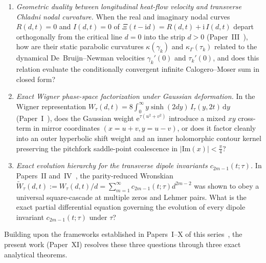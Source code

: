 \documentclass[11pt,reqno]{amsart}
\theoremstyle{definition}
\theoremstyle{remark}
\numberwithin{equation}{section}
\newcommand{\dd}{\mathrm{d}}
\newcommand{\ee}{\mathrm{e}}
\newcommand{\ii}{\mathrm{i}}
\newcommand{\Ima}{\mathrm{Im}}
\begin{document}
\begin{enumerate}[label=\textup{(\arabic*)},leftmargin=2.2em]
\item \textit{Geometric duality between longitudinal heat-flow velocity and transverse Chladni nodal curvature.} When the real and imaginary nodal curves $R(d,t) = 0$ and $I(d,t) = 0$ of $\Xi(t - \ii d) = R(d,t) + \ii\,I(d,t)$ depart orthogonally from the critical line $d = 0$ into the strip $d > 0$ (Paper~III~\cite{missiaen2026paper3}), how are their static parabolic curvatures $\kappa(\gamma_k)$ and $\kappa_\Gamma(\tau_k)$ related to the dynamical De~Bruijn--Newman velocities $\gamma_k'(0)$ and $\tau_k'(0)$, and does this relation evaluate the conditionally convergent infinite Calogero--Moser sum in closed form?
\item \textit{Exact Wigner phase-space factorization under Gaussian deformation.} In the Wigner representation $W_\tau(d,t) = 8\int_0^\infty y\sinh(2dy)\,I_\tau(y,2t)\,\dd y$~\cite{wigner1932,hudson1974} (Paper~I~\cite{missiaen2026paper1}), does the Gaussian weight $\ee^{\tau(u^2+v^2)}$ introduce a mixed $xy$ cross-term in mirror coordinates $(x = u+v, y = u-v)$, or does it factor cleanly into an outer hyperbolic shift weight and an inner holomorphic contour kernel preserving the pitchfork saddle-point coalescence in $|\Ima(x)| < \frac{\pi}{4}$?
\item \textit{Exact evolution hierarchy for the transverse dipole invariants $c_{2m-1}(t;\tau)$.} In Papers~II and~IV~\cite{missiaen2026paper2,missiaen2026paper4}, the parity-reduced Wronskian $\widetilde{W}_\tau(d,t) := W_\tau(d,t)/d = \sum_{m=1}^\infty c_{2m-1}(t;\tau)d^{2m-2}$ was shown to obey a universal square-cascade at multiple zeros and Lehmer pairs. What is the exact partial differential equation governing the evolution of every dipole invariant $c_{2m-1}(t;\tau)$ under $\tau$?
\end{enumerate}

Building upon the frameworks established in Papers~I--X of this series~\cite{missiaen2026paper1,missiaen2026paper2,missiaen2026paper3,missiaen2026paper4,missiaen2026paper5,missiaen2026paper6,missiaen2026paper7,missiaen2026paper8,missiaen2026paper9,missiaen2026paper10}, the present work (Paper~XI) resolves these three questions through three exact analytical theorems.
\end{document}
